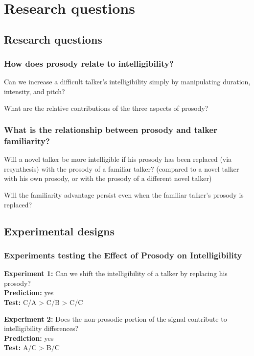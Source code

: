 \chapter{Research questions}

\section{Research questions}
\subsection{How does prosody relate to intelligibility?}
\begin{itm}
	\item{Can we increase a difficult talker’s intelligibility simply by manipulating duration, intensity, and pitch?}
	\item{What are the relative contributions of the three aspects of prosody?}
\end{itm}

\subsection{What is the relationship between prosody and talker familiarity?}
\begin{itm}
	\item{Will a novel talker be more intelligible if his prosody has been replaced (via resynthesis) with the prosody of a familiar talker?  (compared to a novel talker with his own prosody, or with the prosody of a different novel talker)}
	\item{Will the familiarity advantage persist even when the familiar talker’s prosody is replaced?}
\end{itm}


\section{Experimental designs}
\subsection{Experiments testing the Effect of Prosody on Intelligibility}
{\bfseries Experiment 1:} Can we shift the intelligibility of a talker by replacing his prosody?\\
{\bfseries Prediction:} yes\\
{\bfseries Test:} C/A > C/B > C/C

{\bfseries Experiment 2:} Does the non-prosodic portion of the signal contribute to intelligibility differences?\\
{\bfseries Prediction:} yes\\
{\bfseries Test:} A/C > B/C 

